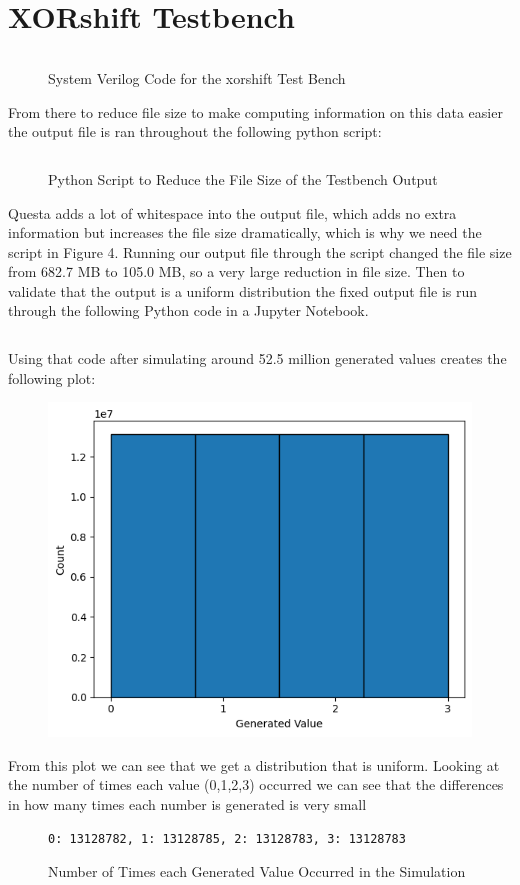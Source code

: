 \documentclass{report}
\begin{document}
\section{XORshift Testbench}
\begin{figure}[H]
    \inputminted{sv}{../xorshift_testbench.sv}
    \caption{System Verilog Code for the xorshift Test Bench}
\end{figure}
From there to reduce file size to make computing information on this data easier the output file is ran throughout the following python script:
\begin{figure}[H]
    \inputminted{python}{../output_fix.py}
    \caption{Python Script to Reduce the File Size of the Testbench Output}
\end{figure}
Questa adds a lot of whitespace into the output file, which adds no extra information but increases the file size dramatically, which is why we need the script in Figure 4. Running our output file through the script changed the file size from 682.7 MB to 105.0 MB, so a very large reduction in file size. Then to validate that the output is a uniform distribution the fixed output file is run through the following Python code in a Jupyter Notebook.
\begin{figure}[H]
    \inputminted{python}{../meow.py}
\end{figure}
Using that code after simulating around 52.5 million generated values creates the following plot:
\begin{figure}[H]
    \begin{center}
        \includegraphics[scale=0.5]{images/rng_plot.png}
    \end{center}
\end{figure}
From this plot we can see that we get a distribution that is uniform. Looking at the number of times each value (0,1,2,3) occurred we can see that the differences in how many times each number is generated is very small
\begin{figure}[H]
    \begin{Verbatim}[frame=single]
0: 13128782, 1: 13128785, 2: 13128783, 3: 13128783
    \end{Verbatim}
    \caption{Number of Times each Generated Value Occurred in the Simulation}
\end{figure}
 \newpage
\end{document}

